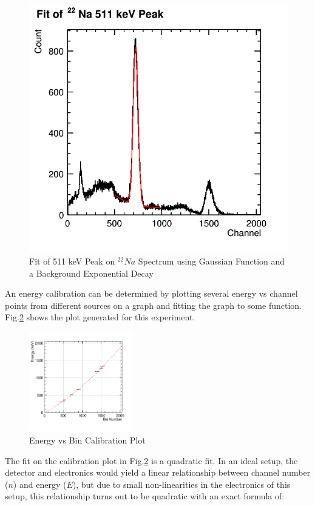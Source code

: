 \documentclass[%
 reprint,
 amsmath,amssymb,
 aps,
 pra,
]{revtex4-1}
\begin{document}
\begin{figure}[H]
	\centering	
	\includegraphics[scale=0.39]{Na511keVFit.png}
	\caption{Fit of 511 keV Peak on $^{22}Na$ Spectrum using Gaussian Function and a Background Exponential Decay}
	\label{Fig:Na511Fit}
\end{figure}

An energy calibration can be determined by plotting several energy vs channel points from different sources on a graph and fitting the graph to some function. Fig.\ref{Fig:EvBin} shows the plot generated for this experiment.

\begin{figure}[H]
\centering	
	\includegraphics[width=0.4\textwidth]{BinvEnergy.png}
	\caption{Energy vs Bin Calibration Plot}
	\label{Fig:EvBin}
\end{figure}

The fit on the calibration plot in Fig.\ref{Fig:EvBin} is a quadratic fit. In an ideal setup, the detector and electronics would yield a linear relationship between channel number ($n$) and energy ($E$), but due to small non-linearities in the electronics of this setup, this relationship turns out to be quadratic with an exact formula of:
\end{document}
